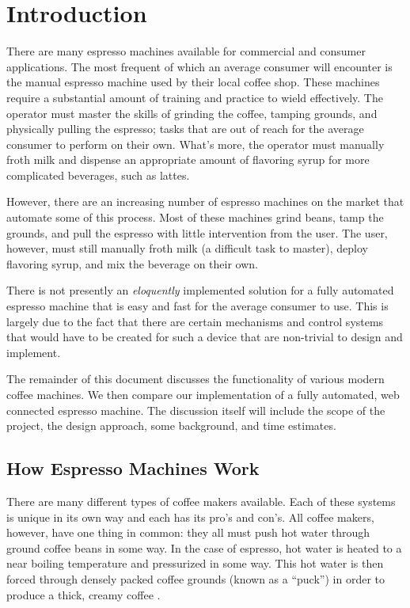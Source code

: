 \documentclass[conference]{IEEEtran}
\begin{document}
%
\section{Introduction} 

There are many espresso machines available for commercial and
consumer applications. The most frequent of which an average consumer will
encounter is the manual espresso machine used by their local coffee shop. These
machines require a substantial amount of training and practice to wield
effectively. The operator must master the skills of grinding the coffee, tamping
grounds, and physically pulling the espresso; tasks that are out of reach for
the average consumer to perform on their own. What's more, the operator must
manually froth milk and dispense an appropriate amount of flavoring syrup for more
complicated beverages, such as lattes.

However, there are an increasing number of espresso machines on the market that
automate some of this process.  Most of these machines grind beans, tamp the
grounds, and pull the espresso with little intervention from the user. The user,
however, must still manually froth milk (a difficult task to master), deploy
flavoring syrup, and mix the beverage on their own.
 
There is not presently an \emph{eloquently} implemented solution for a fully
automated espresso machine that is easy and fast for the average consumer
to use. This is largely due to the fact that there are certain mechanisms and
control systems that would have to be created for such a device that are
non-trivial to design and implement.

The remainder of this document discusses the functionality of various 
modern coffee machines. We then compare our implementation of a fully
automated, web connected espresso machine. The discussion itself will
include the scope of the project, the design approach, some background, 
and time estimates. 

\subsection{How Espresso Machines Work}

There are many different types of coffee makers available. Each of these systems
is unique in its own way and each has its pro's and con's. All coffee makers,
however, have one thing in common: they all must push hot water through ground
coffee beans in some way. In the case of espresso, hot water is heated to a near
boiling temperature and pressurized in some way. This hot water is then forced
through densely packed coffee grounds (known as a ``puck'') in order to produce
a thick, creamy coffee \cite{wikiespresso}.  
\end{document}
